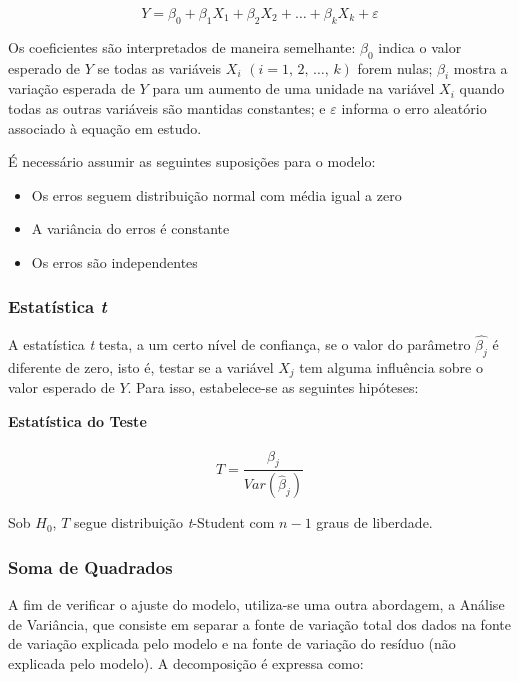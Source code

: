 \documentclass[
]{estat/estat}
\providecommand{\tightlist}{%
  \setlength{\itemsep}{0pt}\setlength{\parskip}{0pt}}\usepackage{longtable,booktabs,array}
\begin{document}
\[
Y=\beta_0 + \beta_1 X_1 + \beta_2 X_2 + \ldots + \beta_k X_k +\varepsilon
\]

Os coeficientes são interpretados de maneira semelhante: \(\beta_0\)
indica o valor esperado de \(Y\) se todas as variáveis \(X_i\)
\((i=1, \, 2,\, \ldots , \, k)\) forem nulas; \(\beta_i\) mostra a
variação esperada de \(Y\) para um aumento de uma unidade na variável
\(X_i\) quando todas as outras variáveis são mantidas constantes; e
\(\varepsilon\) informa o erro aleatório associado à equação em estudo.

É necessário assumir as seguintes suposições para o modelo:

\begin{itemize}
\tightlist
\item
  Os erros seguem distribuição normal com média igual a zero
\item
  A variância do erros é constante
\item
  Os erros são independentes
\end{itemize}

\subsubsection{\texorpdfstring{Estatística
\emph{t}}{Estatística t}}\label{estatuxedstica-t}

A estatística \emph{t} testa, a um certo nível de confiança, se o valor
do parâmetro \(\hat{\beta_j}\) é diferente de zero, isto é, testar se a
variável \(X_j\) tem alguma influência sobre o valor esperado de \(Y\).
Para isso, estabelece-se as seguintes hipóteses:


\textbf{Estatística do Teste}

\[
T=\frac{\hat{\beta}_j}{Var(\hat{\beta}_j)}
\]

Sob \(H_0\), \(T\) segue distribuição \emph{t}-Student com \(n-1\) graus
de liberdade.

\subsubsection{Soma de Quadrados}\label{soma-de-quadrados}

A fim de verificar o ajuste do modelo, utiliza-se uma outra abordagem, a
Análise de Variância, que consiste em separar a fonte de variação total
dos dados na fonte de variação explicada pelo modelo e na fonte de
variação do resíduo (não explicada pelo modelo). A decomposição é
expressa como:
\end{document}
